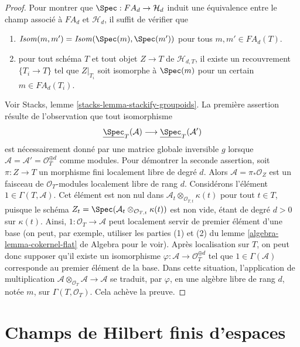 \begin{proof}
\medskip\noindent
Pour montrer que $\Spec : FA_d \to \mathcal{H}_d$ induit une équivalence
entre le champ associé à $FA_d$ et $\mathcal{H}_d$, il suffit de
vérifier que
\begin{enumerate}
\item $\mathit{Isom}(m, m') = \mathit{Isom}(\Spec(m), \Spec(m'))$
pour tous $m, m' \in FA_d(T)$.
\item pour tout schéma $T$ et tout objet $Z \to T$ de $\mathcal{H}_{d, T}$,
il existe un recouvrement $\{T_i \to T\}$ tel que $Z|_{T_i}$ soit
isomorphe à $\Spec(m)$ pour un certain $m \in FA_d(T_i)$.
\end{enumerate}
Voir
Stacks, lemme \ref{stacks-lemma-stackify-groupoids}.
La première assertion résulte de l'observation que tout isomorphisme
$$
\underline{\Spec}_T(\mathcal{A})
\longrightarrow
\underline{\Spec}_T(\mathcal{A}')
$$
est nécessairement donné par une matrice globale inversible $g$ lorsque
$\mathcal{A} = \mathcal{A}' = \mathcal{O}_T^{\oplus d}$ comme modules.
Pour démontrer la seconde assertion, soit $\pi : Z \to T$ un morphisme fini
localement libre de degré $d$. Alors $\mathcal{A}=\pi_*\mathcal{O}_Z$ est un faisceau
de $\mathcal{O}_T$-modules localement libre de rang $d$.
Considérons l'élément $1 \in \Gamma(T, \mathcal{A})$. Cet élément est
non nul dans $\mathcal{A}_t \otimes_{\mathcal{O}_{T, t}} \kappa(t)$
pour tout $t \in T$, puisque le schéma
$Z_t = \Spec(\mathcal{A}_t \otimes_{\mathcal{O}_{T, t}} \kappa(t))$
est non vide, étant de degré $d > 0$ sur $\kappa(t)$. Ainsi,
$1 : \mathcal{O}_T \to \mathcal{A}$ peut localement servir de premier
élément d'une base (on peut, par exemple, utiliser les parties (1) et (2) du
lemme \ref{algebra-lemma-cokernel-flat} de Algebra
pour le voir). Après localisation sur
$T$, on peut donc supposer qu'il existe un isomorphisme
$\varphi : \mathcal{A} \to \mathcal{O}_T^{\oplus d}$
tel que $1 \in \Gamma(\mathcal{A})$ corresponde au premier élément de la base.
Dans cette situation, l'application de multiplication
$\mathcal{A} \otimes_{\mathcal{O}_T} \mathcal{A} \to \mathcal{A}$
se traduit, par $\varphi$, en une algèbre libre de rang $d$, notée $m$, sur
$\Gamma(T, \mathcal{O}_T)$. Cela achève la preuve.
\end{proof}




\section{Champs de Hilbert finis d'espaces}
\label{section-spaces-hilbert}

